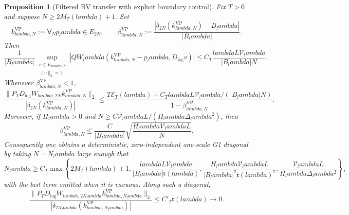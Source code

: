 \documentclass[11pt]{article}
\def\lambda{lambda}%
\newtheorem{proposition}[theorem]{Proposition}
\theoremstyle{remark}
\begin{document}
\begin{proposition}[Filtered BV transfer with explicit boundary control]\label{prop:g1-vp-transfer}
Fix $T>0$ and suppose $N\ge2M_T(\lambda)+1$.  Set
\[
 k^{\mathrm{VP}}_{\lambda,N}:=\mathsf V_Np_\lambda\in E_{2N},
 \qquad
 \beta^{\mathrm{VP}}_{\lambda,N}
 :=\frac{|\delta_{2N}(k^{\mathrm{VP}}_{\lambda,N})-B_\lambda|}
 {|B_\lambda|}.
\]
Then
\begin{equation}\label{eq:g1-vp-form-defect}
 \boxed{
 \frac1{|B_\lambda|}
 \sup_{\substack{v\in E_{\lambda,T}\\\|v\|_2=1}}
 |QW_\lambda(k^{\mathrm{VP}}_{\lambda,N}-p_\lambda,
             D_{\log}v)|
 \le C_T\frac{\lambda L\mathcal V_\lambda}{|B_\lambda|N}.}
\end{equation}
Whenever $\beta^{\mathrm{VP}}_{\lambda,N}<1$,
\begin{equation}\label{eq:g1-vp-master}
 \boxed{
 \frac{\|P_TD_{\log}W_{\lambda,2N}
 k^{\mathrm{VP}}_{\lambda,N}\|_2}
 {|\delta_{2N}(k^{\mathrm{VP}}_{\lambda,N})|}
 \le
 \frac{T\mathcal E_T(\lambda)
 +C_T\lambda L\mathcal V_\lambda/(|B_\lambda|N)}
 {1-\beta^{\mathrm{VP}}_{\lambda,N}}.}
\end{equation}
Moreover, if $H_\lambda>0$ and
$N\ge C\mathcal V_\lambda L/(H_\lambda\Delta_\lambda^2)$, then
\begin{equation}\label{eq:g1-vp-beta-rate}
 \boxed{
 \beta^{\mathrm{VP}}_{\lambda,N}
 \le
 \frac{C}{|B_\lambda|}
 \sqrt{\frac{H_\lambda\mathcal V_\lambda L}{N}}.}
\end{equation}
Consequently one obtains a deterministic, zero-independent one-scale G1
diagonal by taking $N=N_\lambda$ large enough that
\begin{equation}\label{eq:g1-vp-cutoff}
 N_\lambda\ge C_T\max\left\{
 2M_T(\lambda)+1,
 \frac{\lambda L\mathcal V_\lambda}
      {|B_\lambda|\mathfrak r(\lambda)},
 \frac{H_\lambda\mathcal V_\lambda L}
      {|B_\lambda|^2\mathfrak r(\lambda)^2},
 \frac{\mathcal V_\lambda L}{H_\lambda\Delta_\lambda^2}
 \right\},
\end{equation}
with the last term omitted when it is vacuous.  Along such a diagonal,
\begin{equation}\label{eq:g1-vp-vanishing}
 \boxed{
 \frac{\|P_TD_{\log}W_{\lambda,2N_\lambda}
 k^{\mathrm{VP}}_{\lambda,N_\lambda}\|_2}
 {|\delta_{2N_\lambda}(k^{\mathrm{VP}}_{\lambda,N_\lambda})|}
 \le C'_T\mathfrak r(\lambda)\longrightarrow0.}
\end{equation}
\end{proposition}
\end{document}
